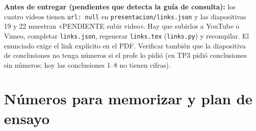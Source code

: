 \documentclass[10.5pt,a4paper]{article}
\begin{document}
\textbf{Antes de entregar (pendientes que detecta la guía de consulta):} los cuatro videos tienen \texttt{url: null} en \texttt{presentacion/links.json} y las diapositivas 19 y 22 muestran «PENDIENTE subir video». Hay que subirlos a YouTube o Vimeo, completar \texttt{links.json}, regenerar \texttt{links.tex} (\texttt{links.py}) y recompilar. El enunciado exige el link explícito en el PDF. Verificar también que la diapositiva de conclusiones no tenga números si el profe lo pidió (en TP3 pidió conclusiones sin números; hoy las conclusiones 1--8 no tienen cifras).

\section{Números para memorizar y plan de ensayo}
\end{document}
